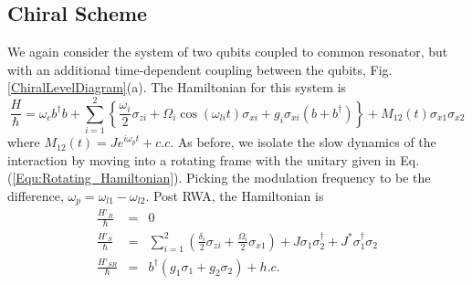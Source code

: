 \subsection{Chiral Scheme}
%
We again consider the system of two qubits coupled to common resonator, but with an additional time-dependent coupling between the qubits, Fig. \ref{ChiralLevelDiagram}(a). The Hamiltonian for this system is
%
\begin{equation}
\frac{H}{\hbar} = \omega_c b^\dagger b + \sum_{i=1}^2 \left\{ \frac{\omega_i}{2}\sigma_{zi} + \Omega_i \cos \left( \omega_{li} t \right) \sigma_{xi}+ g_i \sigma_{xi} (b + b^\dagger)\right\} + M_{12}(t) \sigma_{x1} \sigma_{x2}
\end{equation}
%
where $M_{12}(t) = J e^{i \omega_p t} + c.c$. As before, we isolate the slow dynamics of the interaction by moving into a rotating frame with the unitary given in Eq. (\ref{Equ:Rotating_Hamiltonian}). Picking the modulation frequency to be the difference, $\omega_p = \omega_{l1} - \omega_{l2}$. Post RWA, the Hamiltonian is
 \begin{eqnarray}\label{Two_Qubit_Hamiltonian}
\frac{H'_R}{\hbar} & = & 0 \nonumber \\
\frac{H'_S}{\hbar} & = & \sum_{i=1}^2 \left( \frac{\delta_i}{2}  \sigma_{zi}  + \frac{\Omega_i}{2} \sigma_{x1} \right) + J \sigma_1 \sigma_2^\dagger + J^* \sigma_1^\dagger \sigma_2 \nonumber \\
\frac{H'_{SR}}{\hbar} & = &  b^\dagger ( g_1 \sigma_1 + g_2 \sigma_2 ) + h.c. 
\end{eqnarray} 

